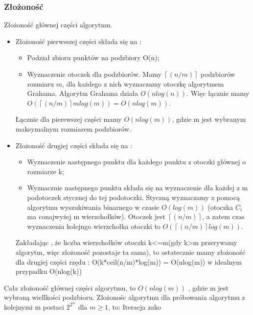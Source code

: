 \documentclass[11pt]{article}
\theoremstyle{remark} \newtheorem{definition}{def.}
\theoremstyle{definition} \newtheorem{twierdzenie}{tw.}
\begin{document}
    \subsubsection{Złożoność}
    Złożoność głównej części algorytmu.
    \begin{itemize}
        \item Złożoność pierwsszej części składa się na :
                \begin{itemize}
                    \item   Podział zbioru punktów na podzbiory O(n);
                    \item   Wyznaczenie otoczek dla podzbiorów. Mamy $\left\lceil(n/m)\right\rceil$ podzbiorów
                            rozmiaru $m$, dla każdego z nich wyznaczamy otoczkę algorytmem Grahama.
                            Algorytm Grahama działa $O(nlog(n))$. Więc łącznie mamy $O(\left\lceil(n/m)\right\rceil m log(m)) = O(nlog(m))$.
                \end{itemize}
                Łącznie dla pierewszej części mamy $O(nlog(m))$, gdzie m jest wybranym maksymalnym rozmiarem podzbiorów.

        \item Złożoność drugiej części składa się na :
                 \begin{itemize}
                     \item   Wyznaczenie następnego punktu dla każdego punktu z otoczki głównej o rozmiarze k;
                     \item   Wyznacznie następnego punktu składa się na wyznaczenie dla każdej z m podotoczek
                            stycznej do tej podotoczki. Styczną wyznaczamy z pomocą algorytmu wyszukiwania binarnego w czasie $O(log(m))$
                            (otoczka $C_i$ ma conajwyżej m wierzchołków). Otoczek jest $\left\lceil(n/m)\right\rceil$, a zatem czas
                            wyznaczenia kolejngo wierzchołka otoczki to $O(\left\lceil(n/m)\right\rceil log(m))$.    
                 \end{itemize}
                 Zakładając , że liczba wierzchołków otoczki k<=m(gdy k>m przerywamy algorytm, więc złożoność pozostaje ta sama),
                  to ostatecznie mamy złożoność dla drugiej części rzędu : O(k*ceil(n/m)*log(m)) = O(nlog(m)) w idealnym przypadku O(nlog(k))
    \end{itemize}

    Cała złożoność głównej części algorytmu, to $O(nlog(m))$ , gdzie m jest wybraną wiellkości podzbioru.
    Złożonośc algorytmu dla próbowania algorytmu z kolejnymi m postaci $2^{2^m}$ dla $m \ge 1$, to:
    Iteracja zako
    
\end{document}
